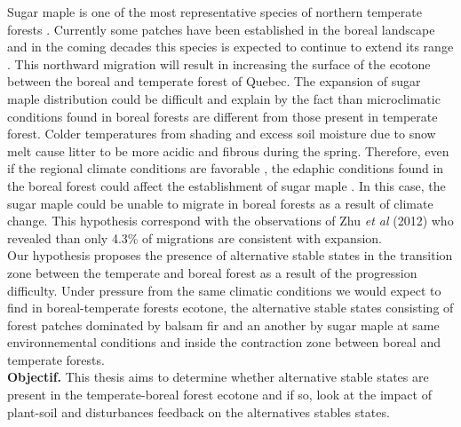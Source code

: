\documentclass[12pt]{article}
\begin{document}

Sugar maple is one of the most representative species of northern temperate forests \cite{Graignic2013,Messaoud2007,Kellman2004}. Currently some patches have been established in the boreal landscape  and in the coming decades this species is expected to continue to extend its range \cite{Graignic2013,Goldblum2005,Woodall2009}. This northward migration will result in increasing the surface of the ecotone between the boreal and temperate forest of Quebec. The expansion of sugar maple distribution could be difficult and explain by the fact than microclimatic conditions found in boreal forests are different from those present in temperate forest. Colder temperatures from shading and excess soil moisture due to snow melt cause litter to be more acidic and fibrous during the spring. Therefore, even if the regional climate conditions are favorable \cite{Kellman2004}, the edaphic conditions found in the boreal forest could affect the establishment of sugar maple \cite{Kellman2004,Moore2008}. In this case, the sugar maple could be unable to migrate in boreal forests as a result of climate change. This hypothesis correspond with the observations of Zhu \emph{et al} (2012) who revealed than only 4.3\% of migrations are consistent with expansion\cite{Zhu2012}.\\


Our hypothesis proposes the presence of alternative stable states in the transition zone between the temperate and boreal forest as a result of the progression difficulty. Under pressure from the same climatic conditions we would expect to find in boreal-temperate forests ecotone, the alternative stable states consisting of forest patches dominated by balsam fir and an another by sugar maple at same environnemental conditions and inside the contraction zone between boreal and temperate forests. \\

\textbf{Objectif.} This thesis aims to determine whether alternative stable states are present in the temperate-boreal forest ecotone and if so, look at the impact of plant-soil and disturbances feedback on the alternatives stables states. 



\newpage

\end{document}
